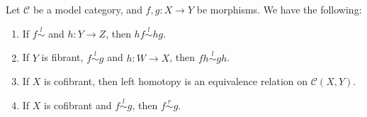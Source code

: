 \documentclass[../thesis.tex]{subfiles}
\begin{document}
            \begin{proposition}\label{prop: basic-homotopy}
                Let $\mathcal{C}$ be a model category, and $f,g:X\rightarrow Y$ be morphisms. We have the following:
                \begin{enumerate}
                    \item If $f \overset{l}{\sim}$ and $h: Y \rightarrow Z$, then $hf \overset{l}{\sim} hg$.
                    \item If $Y$ is fibrant, $f \overset{l}{\sim} g$ and $h: W \rightarrow X$, then $fh \overset{l}{\sim} gh$.
                    \item If $X$ is cofibrant, then left homotopy is an equivalence relation on $\mathcal{C}(X,Y)$.
                    \item If $X$ is cofibrant and $f \overset{l}{\sim} g$, then $f \overset{r}{\sim} g$.
                \end{enumerate}
            \end{proposition}
\end{document}
